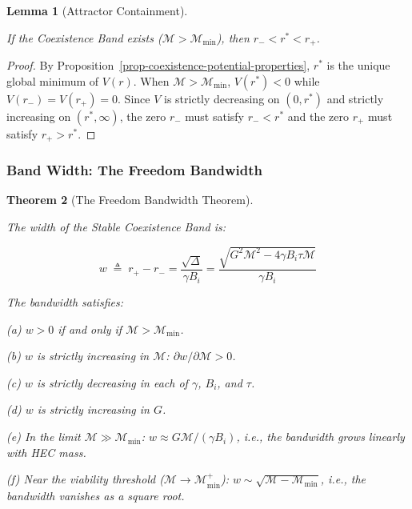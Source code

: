 \documentclass[11pt]{article}
\theoremstyle{plain}
\newtheorem{theorem}{Theorem}
\newtheorem{lemma}[theorem]{Lemma}
\theoremstyle{definition}
\theoremstyle{remark}
\let\origsubsubsection\subsubsection
\renewcommand{\subsubsection}{\needspace{4\baselineskip}\origsubsubsection}
\begin{document}
\begin{lemma}[Attractor Containment]
\label{lem-attractor-containment}

If the Coexistence Band exists ($\mathcal{M} > \mathcal{M}_{\min}$), then $r_- < r^* < r_+$.
\end{lemma}

\begin{proof}
By Proposition~\ref{prop-coexistence-potential-properties}, $r^*$ is the unique global minimum of $V(r)$. When $\mathcal{M} > \mathcal{M}_{\min}$, $V(r^*) < 0$ while $V(r_-) = V(r_+) = 0$. Since $V$ is strictly decreasing on $(0, r^*)$ and strictly increasing on $(r^*, \infty)$, the zero $r_-$ must satisfy $r_- < r^*$ and the zero $r_+$ must satisfy $r_+ > r^*$.
\end{proof}

\subsubsection{Band Width: The Freedom
Bandwidth}\label{band-width-the-freedom-bandwidth}

\begin{theorem}[The Freedom Bandwidth Theorem]
\label{thm-freedom-bandwidth}

The width of the Stable Coexistence Band is:

$$w \;\triangleq\; r_+ - r_- = \frac{\sqrt{\Delta}}{\gamma B_i} = \frac{\sqrt{G^2 \mathcal{M}^2 - 4\gamma B_i \tau \mathcal{M}}}{\gamma B_i}$$

The bandwidth satisfies:

(a) $w > 0$ if and only if $\mathcal{M} > \mathcal{M}_{\min}$.

(b) $w$ is strictly increasing in $\mathcal{M}$: $\partial w / \partial \mathcal{M} > 0$.

(c) $w$ is strictly decreasing in each of $\gamma$, $B_i$, and $\tau$.

(d) $w$ is strictly increasing in $G$.

(e) In the limit $\mathcal{M} \gg \mathcal{M}_{\min}$: $w \approx G\mathcal{M}/(\gamma B_i)$, i.e., the bandwidth grows linearly with HEC mass.

(f) Near the viability threshold ($\mathcal{M} \to \mathcal{M}_{\min}^+$): $w \sim \sqrt{\mathcal{M} - \mathcal{M}_{\min}}$, i.e., the bandwidth vanishes as a square root.
\end{theorem}
\end{document}
